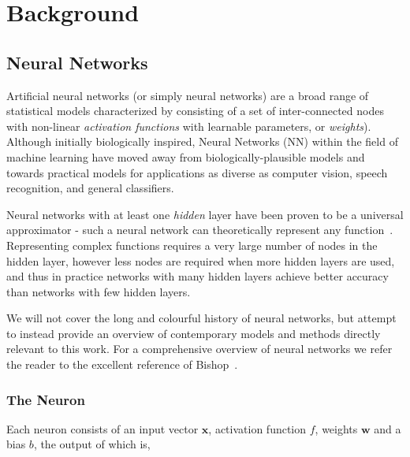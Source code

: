 \documentclass[thesis]{subfiles}
\begin{document}


\chapter{Background}
\label{background}

\section{Neural Networks}
Artificial neural networks (or simply neural networks) are a broad range of statistical models characterized by consisting of a set of inter-connected nodes with non-linear \emph{activation functions} with learnable parameters, or \emph{weights}). Although initially biologically inspired, Neural Networks (NN) within the field of machine learning have moved away from biologically-plausible models and towards practical models for applications as diverse as computer vision, speech recognition, and general classifiers.

Neural networks with at least one \emph{hidden} layer have been proven to be a universal approximator - \ie such a neural network can theoretically represent any function~\cite{journals/mcss/Cybenko92,hornik89a}. Representing complex functions requires a very large number of nodes in the hidden layer, however less nodes are required when more hidden layers are used, and thus in practice networks with many hidden layers achieve better accuracy than networks with few hidden layers. 

We will not cover the long and colourful history of neural networks, but attempt to instead provide an overview of contemporary models and methods directly relevant to this work. For a comprehensive overview of neural networks we refer the reader to the excellent reference of Bishop~\cite{Bishop1995}.

\subsection{The Neuron}
Each neuron consists of an input vector $\mathbf{x}$, activation function $f$, weights $\mathbf{w}$ and a bias $b$, the output of which is,
\end{document}
